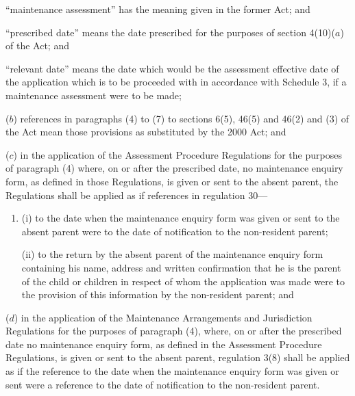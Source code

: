 \documentclass[12pt,a4paper]{article}
\begin{document}
\begin{enumerate}
“maintenance assessment” has the meaning given in the former Act; and

“prescribed date” means the date prescribed for the purposes of section 4(10)($a$)  of the Act;
%
and

    “relevant date” means the date which would be the assessment effective date of the application which is to be proceeded with in accordance with Schedule 3, if a maintenance assessment were to be made;

($b$) references in paragraphs (4) to (7) to sections 6(5), 46(5) and 46(2) and (3) of the Act mean those provisions as substituted by the 2000 Act; and

($c$) in the application of the Assessment Procedure Regulations for the purposes of paragraph (4) where, on or after the prescribed date, no maintenance enquiry form, as defined in those Regulations, is given or sent to the absent parent, the Regulations shall be applied as if references in regulation 30—
\begin{enumerate}\item[]
(i) to the date when the maintenance enquiry form was given or sent to the absent parent were to the date of notification to the non-resident parent;

(ii) to the return by the absent parent of the maintenance enquiry form containing his name, address and written confirmation that he is the parent of the child or children in respect of whom the application was made were to the provision of this information by the non-resident parent; and
\end{enumerate}

\pagebreak[3]

($d$) in the application of the Maintenance Arrangements and Jurisdiction Regulations for the purposes of paragraph (4), where, on or after the prescribed date no maintenance enquiry form, as defined in the Assessment Procedure Regulations, is given or sent to the absent parent, regulation 3(8) shall be applied as if the reference to the date when the maintenance enquiry form was given or sent were a reference to the date of notification to the non-resident parent.
\end{enumerate}

\end{document}

